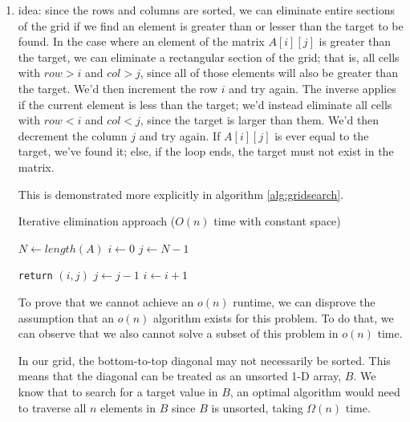 \documentclass[12pt]{article}
\begin{document}
\begin{enumerate}
    \item idea: since the rows and columns are sorted, we can eliminate entire sections of the grid if we find an element 
    is greater than or lesser than the target to be found. In the case where an element of the matrix $A[i][j]$ is greater 
    than the target, we can eliminate a rectangular section of the grid; that is, all cells with $row > i$ and $col > j$, since 
    all of those elements will also be greater than the target. We'd then increment the row $i$ and try again. The inverse 
    applies if the current element is less than the target; we'd instead eliminate all cells with $row < i$ and $col < j$, 
    since the target is larger than them. We'd then decrement the column $j$ and try again. If $A[i][j]$ is ever equal to 
    the target, we've found it; else, if the loop ends, the target must not exist in the matrix.
    
    This is demonstrated more explicitly in algorithm \ref{alg:gridsearch}.
    
    \begin{algorithm}
        \caption{Iterative elimination approach ($O(n)$ time with constant space)}\label{alg:gridsearch}
        \begin{algorithmic}
            \State $N \gets length(A)$
            \State $i \gets 0$
            \State $j \gets N - 1$
            
                    \State \texttt{return} $(i, j)$
                \Else
                        \State $j \gets j - 1$
                    \Else
                        \State $i \gets i + 1$
                    \EndIf
                \EndIf
            \EndWhile
        \end{algorithmic}
    \end{algorithm}

    To prove that we cannot achieve an $o(n)$ runtime, we can disprove the assumption that an $o(n)$ algorithm exists for 
    this problem. To do that, we can observe that we also cannot solve a subset of this problem in $o(n)$ time. 

    In our grid, the bottom-to-top diagonal may not necessarily be sorted. This means that the diagonal 
    can be treated as an unsorted 1-D array, $B$. We know that to search for a target value in $B$, an optimal algorithm 
    would need to traverse all $n$ elements in $B$ since $B$ is unsorted, taking $\Omega(n)$ time.


\end{enumerate}
\end{document}
